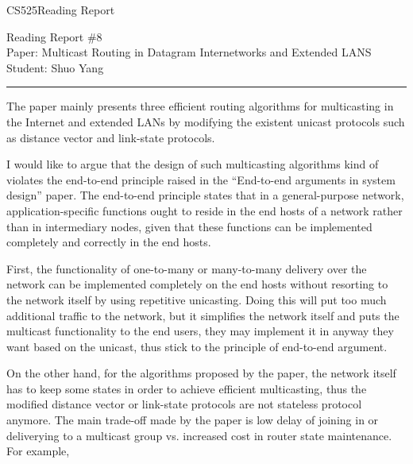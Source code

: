 \documentclass[11pt]{article}
\def\CourseCode{CS525}
\def\ReportNo{8}
\def\Category{Reading Report}
\def\PaperTitle{Multicast Routing in Datagram Internetworks and
  Extended LANS}
\def\Author{Shuo Yang}
\begin{document}
\noindent

\CourseCode \hfill \Category

\begin{center}
Reading Report \#\ReportNo\\
Paper: \PaperTitle\\
Student: \Author\\
\end{center}

\hrule\smallskip
\vspace{1.5em}

The paper mainly presents three efficient routing algorithms for
multicasting in the Internet and extended LANs by modifying the existent
unicast protocols such as distance vector and link-state protocols. 

\vspace{1em}
I would like to argue that the design of such multicasting algorithms
kind of violates the end-to-end principle raised in the ``End-to-end
arguments in system design'' paper. The end-to-end principle
states that in a general-purpose network, application-specific
functions ought to reside in the end hosts of a network rather than in
intermediary nodes, given that these functions can be implemented
completely and correctly in the end hosts. 

\vspace{1em}
First, the functionality of one-to-many or many-to-many
delivery over the network can be implemented completely on the end
hosts without resorting to the network itself by using repetitive
unicasting. Doing this will put too much additional traffic to the
network, but it simplifies the network itself and puts the
multicast functionality to the end users, they may implement it in
anyway they want based on the unicast, thus stick to the principle of
end-to-end argument. 

\vspace{1em}
On the other hand, for the algorithms proposed by the paper, the
network itself has to keep some states in order to achieve efficient
multicasting, thus the modified distance vector or link-state
protocols are not stateless protocol anymore. The main trade-off made
by the paper is low delay of joining in or deliverying to a multicast
group vs. increased cost in router state maintenance. For example,
\end{document}
